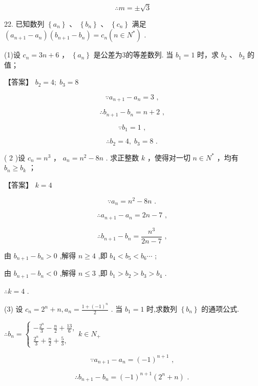 \documentclass[10pt]{article}
\begin{document}
\[
\therefore m =  \pm  \sqrt{3}
\]

22. 已知数列 \(\left\{  {a}_{n}\right\}\) 、 \(\left\{  {b}_{n}\right\}\) 、 \(\left\{  {c}_{n}\right\}\) 满足 \(\left( {{a}_{n + 1} - {a}_{n}}\right) \left( {{b}_{n + 1} - {b}_{n}}\right)  = {c}_{n}\left( {n \in  {N}^{ * }}\right)\) .

(1)设 \({c}_{n} = {3n} + 6\) ， \(\left\{  {a}_{n}\right\}\) 是公差为3的等差数列. 当 \({b}_{1} = 1\) 时，求 \({b}_{2}\) 、 \({b}_{3}\) 的值；

【答案】 \({b}_{2} = 4;\;{b}_{3} = 8\)

\[
\because {a}_{n + 1} - {a}_{n} = 3\text{ , }
\]

\[
\therefore {b}_{n + 1} - {b}_{n} = n + 2\text{ , }
\]

\[
\because {b}_{1} = 1\text{ , }
\]

\[
\therefore {b}_{2} = 4,\;{b}_{3} = 8\text{ . }
\]

( 2 )设 \({c}_{n} = {n}^{3}\text{ ， }{a}_{n} = {n}^{2} - {8n}\) . 求正整数 \(k\) ，使得对一切 \(n \in  {N}^{ * }\) ，均有 \({b}_{n} \geq  {b}_{k}\) ；

【答案】 \(k = 4\)

\[
\because {a}_{n} = {n}^{2} - {8n}\text{ . }
\]

\[
\therefore {a}_{n + 1} - {a}_{n} = {2n} - 7\text{ , }
\]

\[
\therefore {b}_{n + 1} - {b}_{n} = \frac{{n}^{3}}{{2n} - 7}\text{ , }
\]

由 \({b}_{n + 1} - {b}_{n} > 0\) ,解得 \(n \geq  4\) ,即 \({b}_{4} < {b}_{5} < {b}_{6}\cdots\) ;

由 \({b}_{n + 1} - {b}_{n} < 0\) ,解得 \(n \leq  3\) ,即 \({b}_{1} > {b}_{2} > {b}_{3} > {b}_{4}\) .

\(\therefore k = 4\) .

(3) 设 \({c}_{n} = {2}^{n} + n,{a}_{n} = \frac{1 + {\left( -1\right) }^{n}}{2}\) . 当 \({b}_{1} = 1\) 时,求数列 \(\left\{  {b}_{n}\right\}\) 的通项公式.

\(\therefore {b}_{n} = \left\{  {\begin{array}{l}  - \frac{{2}^{n}}{3} - \frac{n}{2} + \frac{13}{6}, \\  \frac{{2}^{n}}{3} + \frac{n}{2} + \frac{5}{3}, \end{array}k \in  {N}_{ + }}\right.\)

\[
\because {a}_{n + 1} - {a}_{n} = {\left( -1\right) }^{n + 1}\text{ , }
\]

\[
\therefore {b}_{n + 1} - {b}_{n} = {\left( -1\right) }^{n + 1}\left( {{2}^{n} + n}\right) \text{ . }
\]
\end{document}
